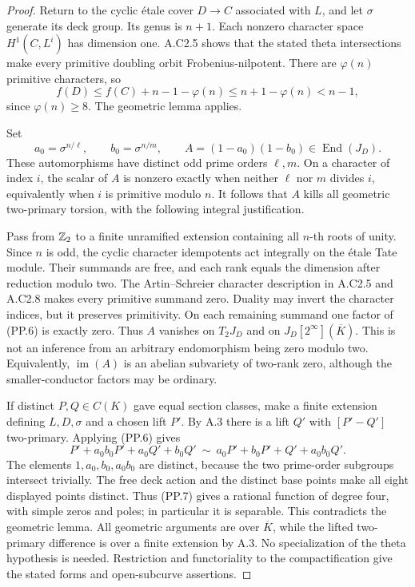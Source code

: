\begin{proof}
Return to the cyclic \'etale cover $D\to C$ associated
with $L$, and let $\sigma$ generate its deck group.
Its genus is $n+1$. Each nonzero character space
$H^1(C,L^i)$ has dimension one. A.C2.5 shows that
the stated theta intersections make every primitive
doubling orbit Frobenius-nilpotent. There are
$\varphi(n)$ primitive characters, so
\[
 f(D)\le f(C)+n-1-\varphi(n)
       \le n+1-\varphi(n)<n-1,                            \tag{PP.5}
\]
since $\varphi(n)\ge8$. The geometric lemma applies.

Set
\[
 a_0=\sigma^{n/\ell},\qquad b_0=\sigma^{n/m},\qquad
          A=(1-a_0)(1-b_0)\in\operatorname{End}(J_D).
                                                               \tag{PP.6}
\]
These automorphisms have distinct odd prime orders
$\ell,m$. On a character of index $i$, the scalar of
$A$ is nonzero exactly when neither $\ell$ nor $m$
divides $i$, equivalently when $i$ is primitive
modulo $n$. It follows that $A$ kills all geometric
two-primary torsion, with the following integral
justification.

Pass from $\mathbb Z_2$ to a finite unramified extension
containing all $n$-th roots of unity. Since $n$ is odd,
the cyclic character idempotents act integrally on
the \'etale Tate module. Their summands are free,
and each rank equals the dimension after reduction
modulo two. The Artin--Schreier character description
in A.C2.5 and A.C2.8 makes every primitive summand
zero. Duality may invert the character indices,
but it preserves primitivity.
On each remaining summand one factor of
(PP.6) is exactly zero. Thus $A$ vanishes on
$T_2J_D$ and on $J_D[2^\infty](\overline K)$.
This is not an inference from an arbitrary
endomorphism being zero modulo two.
Equivalently, $\operatorname{im}(A)$ is an abelian
subvariety of two-rank zero, although the
smaller-conductor factors may be ordinary.

If distinct $P,Q\in C(K)$ gave equal section classes,
make a finite extension defining $L,D,\sigma$ and a
chosen lift $P'$. By A.3 there is a lift $Q'$ with
$[P'-Q']$ two-primary. Applying (PP.6) gives
\[
 P'+a_0b_0P'+a_0Q'+b_0Q'
 \ \sim\
 a_0P'+b_0P'+Q'+a_0b_0Q'.                                \tag{PP.7}
\]
The elements $1,a_0,b_0,a_0b_0$ are distinct, because
the two prime-order subgroups intersect trivially.
The free deck action and the distinct base points
make all eight displayed points distinct.
Thus (PP.7) gives a rational function of degree four,
with simple zeros and poles; in particular it is
separable. This contradicts the geometric lemma.
All geometric arguments are over $\overline K$,
while the lifted two-primary difference is over a
finite extension by A.3. No specialization of the
theta hypothesis is needed. Restriction and
functoriality to the compactification give the
stated forms and open-subcurve assertions.


\end{proof}
